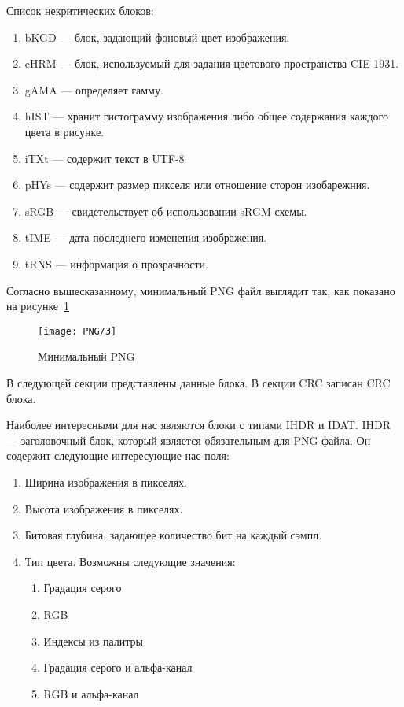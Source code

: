 Список некритических блоков:
\begin{enumerate}
    \item bKGD --- блок, задающий фоновый цвет изображения.
    \item cHRM --- блок, используемый для задания цветового пространства CIE 1931.
    \item gAMA --- определяет гамму.
    \item hIST --- хранит гистограмму изображения либо общее содержания каждого цвета в рисунке.
    \item iTXt --- содержит текст в UTF-8
    \item pHYs --- содержит размер пикселя или отношение сторон изобарежния.
    \item sRGB --- свидетельствует об использовании sRGM схемы.
    \item tIME --- дата последнего изменения изображения.
    \item tRNS --- информация о прозрачности.
\end{enumerate}

Согласно вышесказанному, минимальный PNG файл выглядит так,
как показано на рисунке~\ref{img:png_3}

\begin{figure}[ht!]
    \caption{Минимальный PNG}
    \texttt{[image: PNG/3]}
    \centering
    \label{img:png_3}
\end{figure}

В следующей секции представлены данные блока.
В секции CRC записан CRC блока.

Наиболее интересными для нас являются блоки с типами IHDR и IDAT.
IHDR --- заголовочный блок, который является обязательным для PNG файла.
Он содержит следующие интересующие нас поля:
\begin{enumerate}
    \item Ширина изображения в пикселях.
    \item Высота изображения в пикселях.
    \item Битовая глубина, задающее количество бит на каждый сэмпл.
    \item Тип цвета. Возможны следующие значения:
    \begin{enumerate}
        \item Градация серого
        \item RGB
        \item Индексы из палитры
        \item Градация серого и альфа-канал
        \item RGB и альфа-канал
    \end{enumerate}
\end{enumerate}

